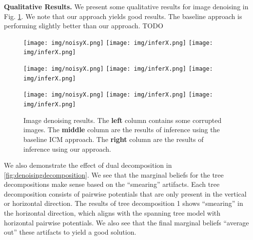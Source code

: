 \documentclass[conference]{IEEEtran}
\begin{document}
{\bf Qualitative Results.} We present some qualitative results for image denoising in Fig. \ref{fig:denoisingresults}. We note that our approach yields good results. The baseline approach is performing slightly better than our approach. TODO

\begin{figure}
\centering
\begin{minipage}{1\columnwidth}
	\texttt{[image: img/noisyX.png]}\hfill%
	\texttt{[image: img/inferX.png]}\hfill%
	\texttt{[image: img/inferX.png]}
\end{minipage}
\begin{minipage}{1\columnwidth}
	\texttt{[image: img/noisyX.png]}\hfill%
	\texttt{[image: img/inferX.png]}\hfill%
	\texttt{[image: img/inferX.png]}
\end{minipage}
\begin{minipage}{1\columnwidth}
	\texttt{[image: img/noisyX.png]}\hfill%
	\texttt{[image: img/inferX.png]}\hfill%
	\texttt{[image: img/inferX.png]}
\end{minipage}
\caption{Image denoising results. The {\bf left} column contains some corrupted images. The {\bf middle} column are the results of inference using the baseline ICM approach. The {\bf right} column are the results of inference using our approach.}
\label{fig:denoisingresults}
\end{figure}

We also demonstrate the effect of dual decomposition in \ref{fig:denoisingdecomposition}. We see that the marginal beliefs for the tree decompositions make sense based on the ``smearing'' artifacts. Each tree decomposition consists of pairwise potentials that are only present in the vertical or horizontal direction. The results of tree decomposition 1 shows ``smearing'' in the horizontal direction, which aligns with the spanning tree model with horizontal pairwise potentials. We also see that the final marginal beliefs ``average out'' these artifacts to yield a good solution.
\end{document}
